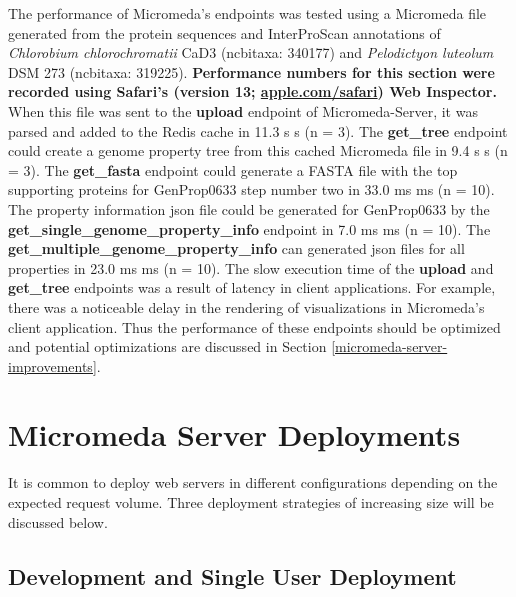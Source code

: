 The performance of Micromeda's endpoints was tested using a Micromeda file generated from the protein sequences and InterProScan annotations of \textit{Chlorobium chlorochromatii} CaD3 (\gls{ncbitaxa}: 340177) and \textit{Pelodictyon luteolum} DSM 273 (\gls{ncbitaxa}:  319225). \textbf{Performance numbers for this section were recorded using Safari's (version 13; \href{http://apple.com/safari}{apple.com/safari}) Web Inspector.} When this file was sent to the \textbf{upload} endpoint of Micromeda-Server, it was parsed and added to the Redis cache in 11.3 s  s (\gls{n} = 3). The \textbf{get\_tree} endpoint could create a genome property tree from this cached Micromeda file in 9.4 s  s (\gls{n} = 3). The \textbf{get\_fasta} endpoint could generate a FASTA file with the top supporting proteins for GenProp0633 step number two in 33.0 ms  ms (\gls{n} = 10). The property information \gls{json} file could be generated for GenProp0633 by the \textbf{get\_single\_genome\_property\_info} endpoint in 7.0 ms  ms (\gls{n} = 10). The \textbf{get\_multiple\_genome\_property\_info} can generated \gls{json} files for all properties in 23.0 ms  ms (\gls{n} = 10). The slow execution time of the \textbf{upload} and \textbf{get\_tree} endpoints was a result of latency in client applications. For example, there was a noticeable delay in the rendering of visualizations in Micromeda's client application. Thus the performance of these endpoints should be optimized and potential optimizations are discussed in Section \ref{micromeda-server-improvements}.

\section{Micromeda Server Deployments} \label{micromeda-server-deployments}

It is common to deploy web servers in different configurations depending on the expected request volume. Three deployment strategies of increasing size will be discussed below. 

\subsection{Development and Single User Deployment}

